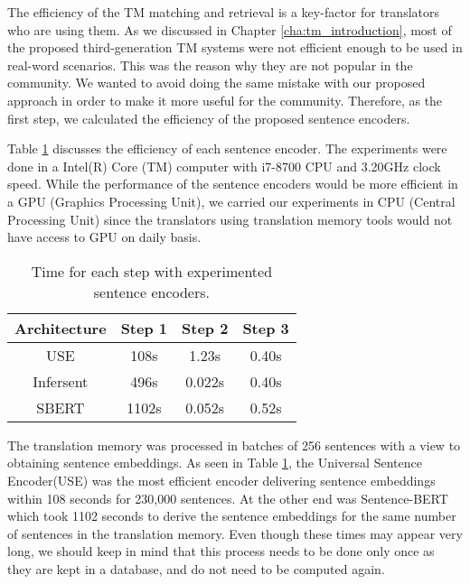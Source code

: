 The efficiency of the TM matching and retrieval is a key-factor for translators who are using them. As we discussed in Chapter \ref{cha:tm_introduction}, most of the proposed third-generation TM systems were not efficient enough to be used in real-word scenarios. This was the reason why they are not popular in the community. We wanted to avoid doing the same mistake with our proposed approach in order to make it more useful for the community. Therefore, as the first step, we calculated the efficiency of the proposed sentence encoders. 

Table \ref{tab:tm_efficiency} discusses the efficiency of each sentence encoder. The experiments were done in a Intel(R) Core (TM) computer with i7-8700  CPU and 3.20GHz clock speed. While the performance of the sentence encoders would be more efficient in a GPU (Graphics Processing Unit), we carried our experiments in CPU (Central Processing Unit) since the translators using translation memory tools would not have access to GPU on daily basis. 


\begin{table}[ht!]
	\begin{center}
		\begin{tabular}{|c|c|c|c|}
			\hline
			\textbf{Architecture} & \textbf{Step 1} & \textbf{Step 2} & \textbf{Step 3}\\ 
			\hline
			USE & 108s & 1.23s & 0.40s \\
			Infersent & 496s & 0.022s & 0.40s \\
			SBERT & 1102s & 0.052s & 0.52s \\
			\hline
		\end{tabular}
		\caption[Time for each step with experimented sentence encoders.]{Time for each step with experimented sentence encoders.}
		\label{tab:tm_efficiency}
	\end{center}
\end{table}

The translation memory was processed in batches of 256 sentences with a view to obtaining sentence embeddings. As seen in Table \ref{tab:tm_efficiency}, the Universal Sentence Encoder(USE) was the most efficient encoder delivering sentence embeddings within 108 seconds for 230,000 sentences. At the other end was Sentence-BERT which took 1102 seconds to derive the sentence embeddings for the same number of sentences in the translation memory. Even though these times may appear very long, we should keep in mind that this process needs to be done only once as they are kept in a database, and do not need to be computed again. 

